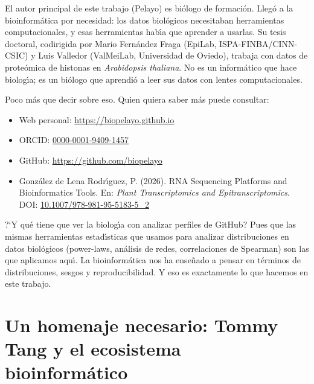 \documentclass[11pt]{article}
\begin{document}
El autor principal de este trabajo (Pelayo) es bi\'{o}logo de formaci\'{o}n. Lleg\'{o} a la bioinform\'{a}tica por necesidad: los datos biol\'{o}gicos necesitaban herramientas computacionales, y esas herramientas hab\'{\i}a que aprender a usarlas. Su tesis doctoral, codirigida por Mario Fern\'{a}ndez Fraga (EpiLab, ISPA-FINBA/CINN-CSIC) y Luis Valledor (ValMeiLab, Universidad de Oviedo), trabaja con datos de prote\'{o}mica de histonas en \textit{Arabidopsis thaliana}. No es un inform\'{a}tico que hace biolog\'{\i}a; es un bi\'{o}logo que aprendi\'{o} a leer sus datos con lentes computacionales.

Poco m\'{a}s que decir sobre eso. Quien quiera saber m\'{a}s puede consultar:
\begin{itemize}
    \item Web personal: \url{https://biopelayo.github.io}
    \item ORCID: \href{https://orcid.org/0000-0001-9409-1457}{0000-0001-9409-1457}
    \item GitHub: \url{https://github.com/biopelayo}
    \item Gonz\'{a}lez de Lena Rodr\'{\i}guez, P. (2026). RNA Sequencing Platforms and Bioinformatics Tools. En: \textit{Plant Transcriptomics and Epitranscriptomics}. DOI: \href{https://doi.org/10.1007/978-981-95-5183-5\_2}{10.1007/978-981-95-5183-5\_2}
\end{itemize}

?`Y qu\'{e} tiene que ver la biolog\'{\i}a con analizar perfiles de GitHub? Pues que las mismas herramientas estad\'{\i}sticas que usamos para analizar distribuciones en datos biol\'{o}gicos (power-laws, an\'{a}lisis de redes, correlaciones de Spearman) son las que aplicamos aqu\'{\i}. La bioinform\'{a}tica nos ha ense\~{n}ado a pensar en t\'{e}rminos de distribuciones, sesgos y reproducibilidad. Y eso es exactamente lo que hacemos en este trabajo.


\section{Un homenaje necesario: Tommy Tang y el ecosistema bioinform\'{a}tico}

\begin{center}
\end{center}
\end{document}
